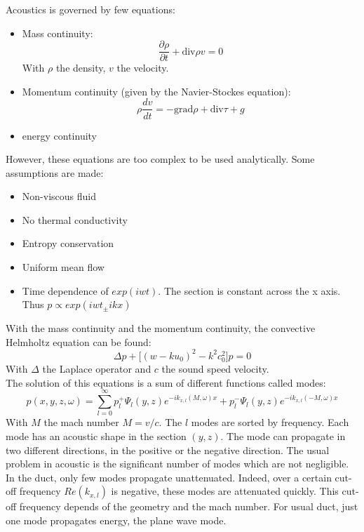 Acoustics is governed by few equations:
\begin{itemize}
    \item Mass continuity: 
        \begin{equation} 
        \frac{\partial \rho}{\partial t}+\mathrm{div}\rho v =0
        \end{equation}
    With $\rho$ the density, $v$ the velocity.
    \item Momentum continuity (given by the Navier-Stockes equation):
        \begin{equation} 
        \rho\frac{dv}{dt}=-\mathrm{grad} \rho+\mathrm{div} \tau+g
        \end{equation}
    \item energy continuity
\end{itemize}
However, these equations are too complex to be used analytically. Some assumptions are made:
\begin{itemize}
    \item Non-viscous fluid
    \item No thermal conductivity
    \item Entropy conservation
    \item Uniform mean flow
    \item Time dependence of $exp(iwt)$. The section is constant across the x axis. Thus $p\propto exp(iwt_\pm ikx)$
\end{itemize}
With the mass continuity and the momentum continuity, the convective Helmholtz equation can be found: 
    \begin{equation} 
    \Delta p +\Big[(w-ku_0)^2-k^2c_0^2\Big]p=0
    \end{equation}
With $\Delta$ the Laplace operator and $c$ the sound speed velocity.\\
The solution of this equations is a sum of different functions called modes: 
\begin{equation} 
    p(x,y,z,\omega)=\sum_{l=0}^\infty p_l^+ \Psi_l(y,z)e^{-ik_{x,l}(M,\omega)x}+p_l^- \Psi_l(y,z)e^{-ik_{x,l}(-M,\omega)x}
    \label{Convective_Helmholtz_Equation}
\end{equation}
With $M$ the mach number $M={v}/{c}$. The $l$ modes are sorted by frequency. Each mode has an acoustic shape in the section $(y,z)$. The mode can propagate in two different directions, in the positive or the negative direction.
The usual problem in acoustic is the significant number of modes which are not negligible. In the duct, only few modes propagate unattenuated. Indeed, over a certain cut-off frequency $Re(k_{x,l})$ is negative, these modes are attenuated quickly. This cut-off frequency depends of the geometry and the mach number. For usual duct, just one mode propagates energy, the plane wave mode.
